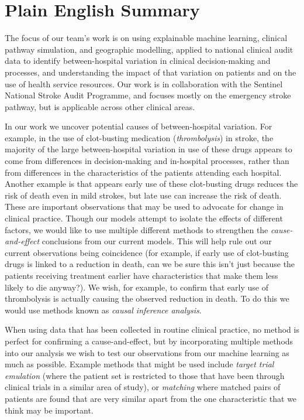 \section*{Plain English Summary}

The focus of our team's work is on using explainable machine learning, clinical pathway simulation, and geographic modelling, applied to national clinical audit data to identify between-hospital variation in clinical decision-making and processes, and understanding the impact of that variation on patients and on the use of health service resources. Our work is in collaboration with the Sentinel National Stroke Audit Programme, and focuses mostly on the emergency stroke pathway, but is applicable across other clinical areas.

In our work we uncover potential causes of between-hospital variation. For example, in the use of clot-busting medication (\textit{thrombolysis}) in stroke, the majority of the large between-hospital variation in use of these drugs appears to come from differences in decision-making and in-hospital processes, rather than from differences in the characteristics of the patients attending each hospital. Another example is that appears early use of these clot-busting drugs reduces the risk of death even in mild strokes, but late use can increase the risk of death. These are important observations that may be used to advocate for change in clinical practice. Though our models attempt to isolate the effects of different factors, we would like to use multiple different methods to strengthen the \textit{cause-and-effect} conclusions from our current models. This will help rule out our current observations being coincidence (for example, if early use of clot-busting drugs is linked to a reduction in death, can we be sure this isn't just because the patients receiving treatment earlier have characteristics that make them less likely to die anyway?). We wish, for example, to confirm that early use of thrombolysis is actually causing the observed reduction in death. To do this we would use methods known as \textit{causal inference analysis}.

When using data that has been collected in routine clinical practice, no method is perfect for confirming a cause-and-effect, but by incorporating multiple methods into our analysis we wish to test our observations from our machine learning as much as possible. Example methods that might be used include \textit{target trial emulation} (where the patient set is restricted to those that have been through clinical trials in a similar area of study), or \textit{matching} where matched pairs of patients are found that are very similar apart from the one characteristic that we think may be important.

